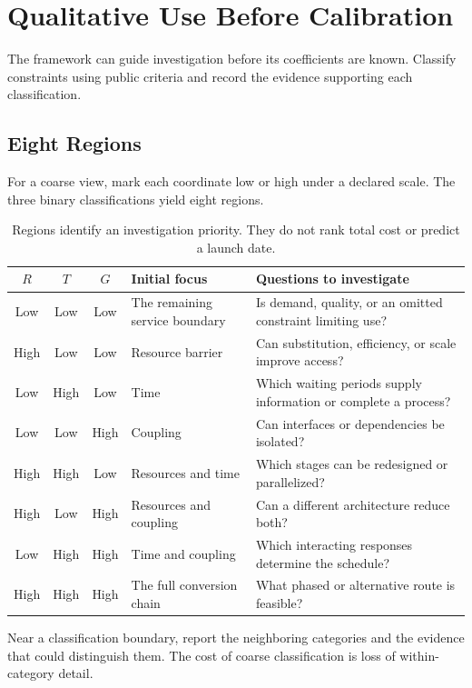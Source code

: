 \section{Qualitative Use Before Calibration}

The framework can guide investigation before its coefficients are known. Classify constraints using public criteria and record the evidence supporting each classification.

\subsection{Eight Regions}

For a coarse view, mark each coordinate low or high under a declared scale. The three binary classifications yield eight regions.

\begin{table}[ht]
\centering\small
\begin{tabularx}{\textwidth}{@{}cccYY@{}}
\toprule
$R$ & $T$ & $G$ & Initial focus & Questions to investigate\\
\midrule
Low & Low & Low & The remaining service boundary & Is demand, quality, or an omitted constraint limiting use?\\
High & Low & Low & Resource barrier & Can substitution, efficiency, or scale improve access?\\
Low & High & Low & Time & Which waiting periods supply information or complete a process?\\
Low & Low & High & Coupling & Can interfaces or dependencies be isolated?\\
High & High & Low & Resources and time & Which stages can be redesigned or parallelized?\\
High & Low & High & Resources and coupling & Can a different architecture reduce both?\\
Low & High & High & Time and coupling & Which interacting responses determine the schedule?\\
High & High & High & The full conversion chain & What phased or alternative route is feasible?\\
\bottomrule
\end{tabularx}
\caption{Regions identify an investigation priority. They do not rank total cost or predict a launch date.}
\end{table}

Near a classification boundary, report the neighboring categories and the evidence that could distinguish them. The cost of coarse classification is loss of within-category detail.

